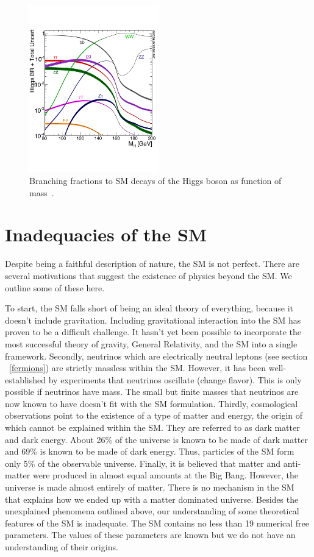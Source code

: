 \begin{figure}[hbtp]
 \begin{center}
   \includegraphics[width=0.5\textwidth]{plots_and_figures/chapter2/higgs_decays.pdf}
   \caption{Branching fractions to SM decays of the Higgs boson as function of mass~\cite{hg_decay}.}
   \label{fig:higs_decays}
 \end{center}
\end{figure}

\section{Inadequacies of the SM}
Despite being a faithful description of nature, the SM is not perfect. There are several motivations that suggest the existence of physics beyond the SM. We outline some of these here.

To start, the SM falls short of being an ideal theory of everything, because it doesn't include gravitation. Including gravitational interaction into the SM has proven to be a difficult challenge. It hasn't yet been possible to incorporate the most successful theory of gravity, General Relativity, and the SM into a single framework. Secondly, neutrinos which are electrically neutral leptons (see section ~\ref{fermions}) are strictly massless within the SM. However, it has been well-established by experiments that neutrinos oscillate (change flavor). This is only possible if neutrinos have mass. The small but finite masses that neutrinos are now known to have doesn't fit with the SM formulation. Thirdly, cosmological observations point to the existence of a type of matter and energy, the origin of which cannot be explained within the SM. They are referred to as dark matter and dark energy. About 26\% of the universe is known to be made of dark matter and 69\% is known to be made of dark energy. Thus, particles of the SM form only 5\% of the observable universe. Finally, it is believed that matter and anti-matter were produced in almost equal amounts at the Big Bang. However, the universe is made almost entirely of matter. There is no mechanism in the SM that explains how we ended up with a matter dominated universe. Besides the unexplained phenomena outlined above, our understanding of some theoretical features of the SM is inadequate. The SM contains no less than 19 numerical free parameters. The values of these parameters are known but we do not have an understanding of their origins.

